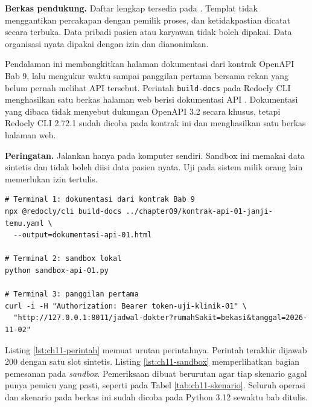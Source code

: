 \textbf{Berkas pendukung.} Daftar lengkap tersedia pada . Templat tidak menggantikan percakapan dengan pemilik proses, dan
ketidakpastian dicatat secara terbuka. Data pribadi pasien atau karyawan tidak boleh dipakai. Data organisasi nyata dipakai dengan izin dan dianonimkan.

\begin{pendalaman}[title={Pendalaman Teknis (opsional): Dokumentasi dari Kontrak dan Sandbox Lokal}]
Pendalaman ini membangkitkan halaman dokumentasi dari kontrak OpenAPI Bab 9, lalu mengukur waktu sampai panggilan pertama bersama rekan yang belum pernah melihat
API tersebut. Perintah \texttt{build-docs} pada Redocly CLI menghasilkan satu berkas halaman web berisi dokumentasi API \cite{c11-redocly}. Dokumentasi yang
dibaca tidak menyebut dukungan OpenAPI 3.2 secara khusus, tetapi Redocly CLI 2.72.1 sudah dicoba pada kontrak ini dan menghasilkan satu berkas halaman web.

\textbf{Peringatan.} Jalankan hanya pada komputer sendiri. Sandbox ini memakai data sintetis dan tidak boleh diisi data pasien nyata. Uji pada sistem milik orang
lain memerlukan izin tertulis.

\begin{lstlisting}[style=ch11bash, caption={Membangkitkan dokumentasi dan menjalankan \textit{sandbox}, tersedia di \berkas{sources/chapter11/README.md}}, label={lst:ch11-perintah}]
# Terminal 1: dokumentasi dari kontrak Bab 9
npx @redocly/cli build-docs ../chapter09/kontrak-api-01-janji-temu.yaml \
  --output=dokumentasi-api-01.html

# Terminal 2: sandbox lokal
python sandbox-api-01.py

# Terminal 3: panggilan pertama
curl -i -H "Authorization: Bearer token-uji-klinik-01" \
  "http://127.0.0.1:8011/jadwal-dokter?rumahSakit=bekasi&tanggal=2026-11-02"
\end{lstlisting}

Listing \ref{lst:ch11-perintah} memuat urutan perintahnya. Perintah terakhir dijawab 200 dengan satu slot sintetis. Listing \ref{lst:ch11-sandbox} memperlihatkan
bagian pemesanan pada \textit{sandbox}. Pemeriksaan dibuat berurutan agar tiap skenario gagal punya pemicu yang pasti, seperti pada Tabel \ref{tab:ch11-skenario}.
Seluruh operasi dan skenario pada berkas ini sudah dicoba pada Python 3.12 sewaktu bab ditulis.


\end{pendalaman}
